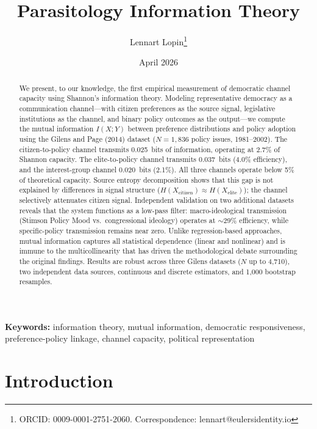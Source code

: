 \documentclass[twocolumn,10pt]{article}
\title{\textbf{Parasitology Information Theory}}
\author[1]{Lennart Lopin\thanks{ORCID: 0009-0001-2751-2060. Correspondence: lennart@eulersidentity.io}}
\affil[1]{Marscoin Foundation / Euler's Identity LLC}
\date{April 2026}
\begin{document}
\maketitle
\thispagestyle{empty}

\begin{abstract}
We present, to our knowledge, the first empirical measurement of democratic channel capacity using Shannon's information theory.  Modeling representative democracy as a communication channel---with citizen preferences as the source signal, legislative institutions as the channel, and binary policy outcomes as the output---we compute the mutual information $I(X;Y)$ between preference distributions and policy adoption using the Gilens and Page (2014) dataset ($N=1{,}836$ policy issues, 1981--2002).  The citizen-to-policy channel transmits 0.025~bits of information, operating at 2.7\% of Shannon capacity.  The elite-to-policy channel transmits 0.037~bits (4.0\% efficiency), and the interest-group channel 0.020~bits (2.1\%).  All three channels operate below 5\% of theoretical capacity.  Source entropy decomposition shows that this gap is not explained by differences in signal structure ($H(X_\text{citizen}) \approx H(X_\text{elite})$); the channel selectively attenuates citizen signal.  Independent validation on two additional datasets reveals that the system functions as a low-pass filter: macro-ideological transmission (Stimson Policy Mood vs.\ congressional ideology) operates at $\sim$29\% efficiency, while specific-policy transmission remains near zero.  Unlike regression-based approaches, mutual information captures all statistical dependence (linear and nonlinear) and is immune to the multicollinearity that has driven the methodological debate surrounding the original findings.  Results are robust across three Gilens datasets ($N$ up to 4,710), two independent data sources, continuous and discrete estimators, and 1,000 bootstrap resamples.
\end{abstract}

\smallskip
\noindent\textbf{Keywords:} information theory, mutual information, democratic responsiveness, preference-policy linkage, channel capacity, political representation

\section{Introduction}
\label{sec:intro}
\end{document}
